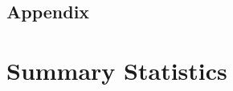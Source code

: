 \documentclass[reqno,onecolumn,letterpaper,12pt]{article}
\begin{document}



\clearpage
\doublespacing
\setcounter{page}{1}
\renewcommand{\thesection}{Appendix \Alph{section}}
\renewcommand\thetable{\Alph{table}}
\renewcommand\thefigure{\Alph{figure}}
\appendix

\begin{centering}
\section*{Appendix}
\end{centering}

\section{Summary Statistics}\label{sum_stats}
\end{document}

